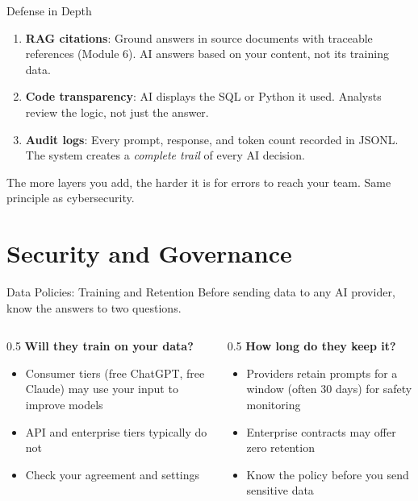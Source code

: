 \documentclass[aspectratio=169]{beamer}
\begin{document}
\begin{frame}{Defense in Depth}
\begin{enumerate}
  \item \textbf{RAG citations}: Ground answers in source documents with traceable references (Module 6). AI answers based on \alert{your content}, not its training data.
  \item \textbf{Code transparency}: AI displays the SQL or Python it used. Analysts review the logic, not just the answer.
  \item \textbf{Audit logs}: Every prompt, response, and token count recorded in JSONL. The system creates a \textit{complete trail} of every AI decision.
\end{enumerate}
\vspace{0.5cm}
The more layers you add, the harder it is for errors to reach your team. \alert{Same principle as cybersecurity.}
\end{frame}

\section{Security and Governance}

\begin{frame}{Data Policies: Training and Retention}
Before sending data to any AI provider, know the answers to two questions.
\vspace{0.3cm}
\begin{columns}[T]
\begin{column}{0.5\textwidth}
\textbf{Will they train on your data?}
\begin{itemize}\small
  \item \alert{Consumer tiers} (free ChatGPT, free Claude) may use your input to improve models
  \item \alert{API and enterprise tiers} typically do not
  \item Check your agreement and settings
\end{itemize}
\end{column}
\begin{column}{0.5\textwidth}
\textbf{How long do they keep it?}
\begin{itemize}\small
  \item Providers retain prompts for a window (often 30 days) for safety monitoring
  \item Enterprise contracts may offer zero retention
  \item Know the policy \alert{before} you send sensitive data
\end{itemize}
\end{column}
\end{columns}
\end{frame}
\end{document}
